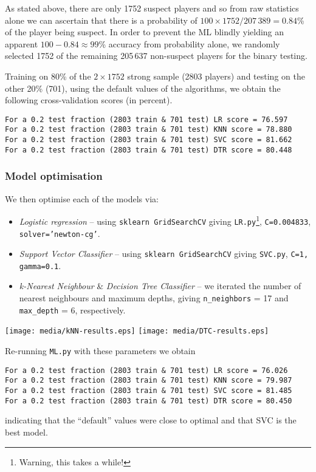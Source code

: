 \documentclass[11pt]{article} %
\begin{document}
As stated above, there are only 1752 suspect players and so from raw statistics alone we can ascertain that
there is a probability of $100\times1752/207\,389 = 0.84$\% of the player being suspect.
In order to prevent the ML blindly yielding an apparent $100 - 0.84 \approx 99$\% accuracy from probability alone, 
we randomly selected 1752 of the remaining 205\,637 non-suspect players for the binary testing.

Training on 80\% of the $2\times1752$ strong sample (2803 players) and testing on the other 20\% (701), using the default
values of the algorithms, we obtain the following cross-validation scores (in percent).
\small
{\color{blue}
\begin{verbatim}
For a 0.2 test fraction (2803 train & 701 test) LR score = 76.597
For a 0.2 test fraction (2803 train & 701 test) KNN score = 78.880
For a 0.2 test fraction (2803 train & 701 test) SVC score = 81.662
For a 0.2 test fraction (2803 train & 701 test) DTR score = 80.448
\end{verbatim}
\normalsize
}

\subsubsection{Model optimisation}
\label{mo}

We then optimise each of the models via:
\begin{itemize}
\item {\em Logistic regression} -- using {\tt sklearn GridSearchCV} giving {\tt LR.py}\footnote{Warning, this takes a while!}, 
  {\tt C=0.004833}, {\tt solver='newton-cg'}.
  
\item {\em Support Vector Classifier} -- using {\tt sklearn GridSearchCV} giving {\tt SVC.py}, {\tt C=1, gamma=0.1}.

\item {\em k-Nearest Neighbour} \& {\em Decision Tree Classifier} -- we iterated the number of nearest neighbours and
  maximum depths, giving {\tt n\_neighbors} = 17 and {\tt max\_depth} = 6, respectively.
  \end{itemize}

\texttt{[image: media/kNN-results.eps]}
\texttt{[image: media/DTC-results.eps]}

Re-running {\tt ML.py} with these parameters we obtain
\small
{\color{blue}
\begin{verbatim}
For a 0.2 test fraction (2803 train & 701 test) LR score = 76.026
For a 0.2 test fraction (2803 train & 701 test) KNN score = 79.987
For a 0.2 test fraction (2803 train & 701 test) SVC score = 81.485
For a 0.2 test fraction (2803 train & 701 test) DTR score = 80.450
\end{verbatim}
\normalsize
}
indicating that the ``default'' values were close to optimal and that SVC is the best model.
\end{document}
